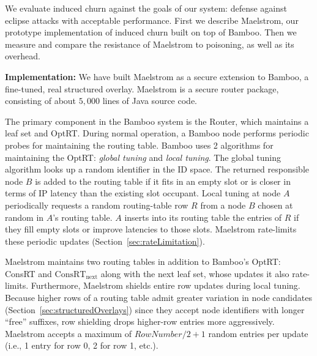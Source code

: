 \documentclass[10pt,twocolumn]{article}
\renewcommand{\paragraph}[1]{\textbf{#1:}}
\newcommand{\PRT}{OptRT\xspace}
\newcommand{\CRT}{ConsRT\xspace}
\newcommand{\CRTNext}{$\mathrm{\CRT}_{\mbox{next}}$\xspace}
\begin{document}
\label{sec:evaluation}

We evaluate induced churn against the goals of our system: defense against
eclipse attacks with acceptable performance.  First we describe Maelstrom, our prototype
implementation of induced churn built on top of Bamboo.  Then we measure
and compare the resistance of Maelstrom to poisoning, as well as its
overhead.


\paragraph{Implementation}
We have built Maelstrom as a secure extension to Bamboo, 
a fine-tuned, real structured overlay. Maelstrom is a secure router package, consisting
of about $5,000$ lines of Java source code.

The primary component in the Bamboo system is the Router, which
maintains 
a leaf set
and
\PRT. During normal operation, a
Bamboo node performs periodic probes for maintaining the routing table. 
Bamboo uses 2 algorithms for maintaining the \PRT: \textit{global tuning} and
\textit{local tuning}. The global tuning algorithm looks up 
a random identifier in the ID space. The returned responsible node $B$
is added to the routing table if it
fits in an empty slot or is closer in terms of IP latency than the
existing slot occupant. Local tuning at node $A$ periodically requests a
random routing-table row $R$ from 
a node $B$ chosen at random in $A$'s routing table.
$A$ inserts into its routing table the entries of $R$ if they fill empty
slots or improve latencies to those slots.
Maelstrom rate-limits these periodic updates
(Section~\ref{sec:rateLimitation}).


Maelstrom maintains two routing tables in addition to
Bamboo's \PRT:
\CRT and \CRTNext along with the next leaf set, whose updates it also rate-limits.
Furthermore, Maelstrom shields entire row
updates during local tuning.
Because higher
rows of a routing table admit greater variation in node candidates (Section~\ref{sec:structuredOverlays}) since they
accept node identifiers with longer ``free'' suffixes, row
shielding drops higher-row entries more aggressively. 
Maelstrom accepts a maximum of $RowNumber/2+1$ random entries per update (i.e., 1 entry for row 0, 2 for
row 1, etc.).
\end{document}
